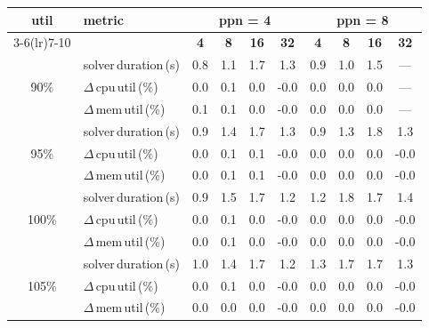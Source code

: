 \begin{tabular}{@{}c l *{8}{c}@{}}
\toprule
\multirow{2}{*}{\textbf{util}} & \multirow{2}{*}{\textbf{metric}} &\multicolumn{4}{c}{\textbf{ppn = 4}} & \multicolumn{4}{c}{\textbf{ppn = 8}}\\
\cmidrule(lr){3-6}\cmidrule(lr){7-10}
 &  & \textbf{4} & \textbf{8} & \textbf{16} & \textbf{32} & \textbf{4} & \textbf{8} & \textbf{16} & \textbf{32}\\
\midrule
\multirow{3}{*}{90\%}
& solver\,duration\,(s) & 0.8 & 1.1 & 1.7 & 1.3 & 0.9 & 1.0 & 1.5 & \multicolumn{1}{c}{—} \\
& $\Delta$\,cpu\,util\,(\%) & 0.0 & 0.1 & 0.0 & -0.0 & 0.0 & 0.0 & 0.0 & \multicolumn{1}{c}{—} \\
& $\Delta$\,mem\,util\,(\%) & 0.1 & 0.1 & 0.0 & -0.0 & 0.0 & 0.0 & 0.0 & \multicolumn{1}{c}{—} \\
\midrule
\multirow{3}{*}{95\%}
& solver\,duration\,(s) & 0.9 & 1.4 & 1.7 & 1.3 & 0.9 & 1.3 & 1.8 & 1.3 \\
& $\Delta$\,cpu\,util\,(\%) & 0.0 & 0.1 & 0.1 & -0.0 & 0.0 & 0.0 & 0.0 & -0.0 \\
& $\Delta$\,mem\,util\,(\%) & 0.0 & 0.1 & 0.1 & -0.0 & 0.0 & 0.0 & 0.0 & -0.0 \\
\midrule
\multirow{3}{*}{100\%}
& solver\,duration\,(s) & 0.9 & 1.5 & 1.7 & 1.2 & 1.2 & 1.8 & 1.7 & 1.4 \\
& $\Delta$\,cpu\,util\,(\%) & 0.0 & 0.1 & 0.0 & -0.0 & 0.0 & 0.0 & 0.0 & -0.0 \\
& $\Delta$\,mem\,util\,(\%) & 0.0 & 0.1 & 0.0 & -0.0 & 0.0 & 0.0 & 0.0 & -0.0 \\
\midrule
\multirow{3}{*}{105\%}
& solver\,duration\,(s) & 1.0 & 1.4 & 1.7 & 1.2 & 1.3 & 1.7 & 1.7 & 1.3 \\
& $\Delta$\,cpu\,util\,(\%) & 0.0 & 0.1 & 0.0 & -0.0 & 0.0 & 0.0 & 0.0 & -0.0 \\
& $\Delta$\,mem\,util\,(\%) & 0.0 & 0.0 & 0.0 & -0.0 & 0.0 & 0.0 & 0.0 & -0.0 \\
\bottomrule
\end{tabular}
